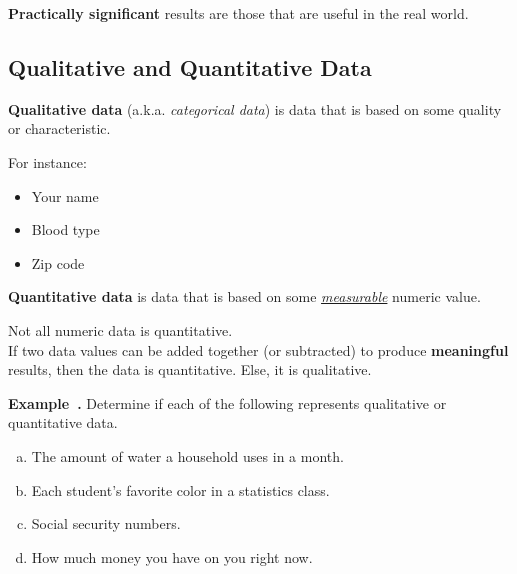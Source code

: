 \documentclass{article}
\newcounter{example}[section]
\newenvironment{example}[1][]{\refstepcounter{example}\par\medskip
   {\color{red}\textbf{Example~\theexample. #1}}}{\medskip}
\begin{document}
\begin{tcolorbox}[colframe=green!60!black,title=\textbf{Practically Significant}]
\textbf{Practically significant} results are those that are useful in the real world.
\end{tcolorbox}
\vspace{8pt}	



\subsection*{Qualitative and Quantitative Data}

\begin{tcolorbox}[colframe=green!60!black,title=\textbf{Qualitative Data}]
\textbf{Qualitative data} (a.k.a. \textit{categorical data}) is data that is based on some quality or characteristic.
\end{tcolorbox}
\vspace{6pt} 
For instance:
\begin{itemize}
	\item Your name
	\item Blood type
	\item Zip code
\end{itemize} 



\begin{tcolorbox}[colframe=green!60!black,title=\textbf{Quantitative Data}]
\textbf{Quantitative data} is data that is based on some \emph{\underline{measurable}} numeric value.
\end{tcolorbox}
\vspace{6pt} 
Not all numeric data is quantitative.	\newline\\	

If two data values can be added together (or subtracted) to produce {\color{blue}\textbf{meaningful}} results, then the data is quantitative. Else, it is qualitative.

\begin{example}
Determine if each of the following represents qualitative or quantitative data.
\begin{enumerate}[(a)]
    \item The amount of water a household uses in a month. 	
    \item Each student's favorite color in a statistics class.
    \item Social security numbers.
    \item How much money you have on you right now. 
\end{enumerate}
\end{example}
\end{document}
